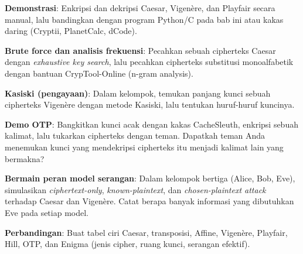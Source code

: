 \documentclass[main.tex]{subfiles}
\begin{document}
\begin{aktivitas}
  \item \textbf{Demonstrasi}: Enkripsi dan dekripsi Caesar, Vigen\`{e}re, dan Playfair secara manual, lalu bandingkan dengan program Python/C pada bab ini atau kakas daring (Cryptii, PlanetCalc, dCode).
  \item \textbf{Brute force dan analisis frekuensi}: Pecahkan sebuah cipherteks Caesar dengan \textit{exhaustive key search}, lalu pecahkan cipherteks substitusi monoalfabetik dengan bantuan CrypTool-Online (n-gram analysis).
  \item \textbf{Kasiski (pengayaan)}: Dalam kelompok, temukan panjang kunci sebuah cipherteks Vigen\`{e}re dengan metode Kasiski, lalu tentukan huruf-huruf kuncinya.
  \item \textbf{Demo OTP}: Bangkitkan kunci acak dengan kakas CacheSleuth, enkripsi sebuah kalimat, lalu tukarkan cipherteks dengan teman. Dapatkah teman Anda menemukan kunci yang mendekripsi cipherteks itu menjadi kalimat lain yang bermakna?
  \item \textbf{Bermain peran model serangan}: Dalam kelompok bertiga (Alice, Bob, Eve), simulasikan \textit{ciphertext-only}, \textit{known-plaintext}, dan \textit{chosen-plaintext attack} terhadap Caesar dan Vigen\`{e}re. Catat berapa banyak informasi yang dibutuhkan Eve pada setiap model.
  \item \textbf{Perbandingan}: Buat tabel ciri Caesar, transposisi, Affine, Vigen\`{e}re, Playfair, Hill, OTP, dan Enigma (jenis cipher, ruang kunci, serangan efektif).
\end{aktivitas}

\end{document}
